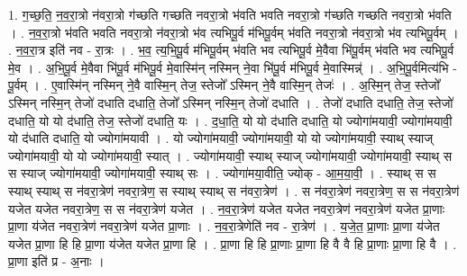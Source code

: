 \documentclass[17pt]{extarticle}
\begin{document}
1. ग॒च्छ॒ति॒ न॒व॒रा॒त्रो न॑वरा॒त्रो ग॑च्छति गच्छति नवरा॒त्रो भ॑वति भवति नवरा॒त्रो ग॑च्छति गच्छति नवरा॒त्रो भ॑वति । . न॒व॒रा॒त्रो भ॑वति भवति नवरा॒त्रो न॑वरा॒त्रो भ॑व त्यभिपू॒र्व म॑भिपू॒र्वम् भ॑वति नवरा॒त्रो न॑वरा॒त्रो भ॑व त्यभिपू॒र्वम् । . न॒व॒रा॒त्र इति॑ नव - रा॒त्रः । . भ॒व॒ त्य॒भि॒पू॒र्व म॑भिपू॒र्वम् भ॑वति भव त्यभिपू॒र्व मे॒वैवा भि॑पू॒र्वम् भ॑वति भव त्यभिपू॒र्व मे॒व । . अ॒भि॒पू॒र्व मे॒वैवा भि॑पू॒र्व म॑भिपू॒र्व मे॒वास्मि॑न् नस्मिन् ने॒वा भि॑पू॒र्व म॑भिपू॒र्व मे॒वास्मिन्न्॑ । . अ॒भि॒पू॒र्वमित्य॑भि - पू॒र्वम् । . ए॒वास्मि॑न् नस्मिन् ने॒वै वास्मि॒न् तेज॒ स्तेजो᳚ ऽस्मिन् ने॒वै वास्मि॒न् तेजः॑ । . अ॒स्मि॒न् तेज॒ स्तेजो᳚ ऽस्मिन् नस्मि॒न् तेजो॑ दधाति दधाति॒ तेजो᳚ ऽस्मिन् नस्मि॒न् तेजो॑ दधाति । . तेजो॑ दधाति दधाति॒ तेज॒ स्तेजो॑ दधाति॒ यो यो द॑धाति॒ तेज॒ स्तेजो॑ दधाति॒ यः । . द॒धा॒ति॒ यो यो द॑धाति दधाति॒ यो ज्योगा॑मयावी॒ ज्योगा॑मयावी॒ यो द॑धाति दधाति॒ यो ज्योगा॑मयावी । . यो ज्योगा॑मयावी॒ ज्योगा॑मयावी॒ यो यो ज्योगा॑मयावी॒ स्याथ् स्याज् ज्योगा॑मयावी॒ यो यो ज्योगा॑मयावी॒ स्यात् । . ज्योगा॑मयावी॒ स्याथ् स्याज् ज्योगा॑मयावी॒ ज्योगा॑मयावी॒ स्याथ् स स स्याज् ज्योगा॑मयावी॒ ज्योगा॑मयावी॒ स्याथ् सः । . ज्योगा॑मया॒वीति॒ ज्योक् - आ॒म॒या॒वी॒ । . स्याथ् स स स्याथ् स्याथ् स न॑वरा॒त्रेण॑ नवरा॒त्रेण॒ स स्याथ् स्याथ् स न॑वरा॒त्रेण॑ । . स न॑वरा॒त्रेण॑ नवरा॒त्रेण॒ स स न॑वरा॒त्रेण॑ यजेत यजेत नवरा॒त्रेण॒ स स न॑वरा॒त्रेण॑ यजेत । . न॒व॒रा॒त्रेण॑ यजेत यजेत नवरा॒त्रेण॑ नवरा॒त्रेण॑ यजेत प्रा॒णाः प्रा॒णा य॑जेत नवरा॒त्रेण॑ नवरा॒त्रेण॑ यजेत प्रा॒णाः । . न॒व॒रा॒त्रेणेति॑ नव - रा॒त्रेण॑ । . य॒जे॒त॒ प्रा॒णाः प्रा॒णा य॑जेत यजेत प्रा॒णा हि हि प्रा॒णा य॑जेत यजेत प्रा॒णा हि । . प्रा॒णा हि हि प्रा॒णाः प्रा॒णा हि वै वै हि प्रा॒णाः प्रा॒णा हि वै । . प्रा॒णा इति॑ प्र - अ॒नाः । \newline
\end{document}
